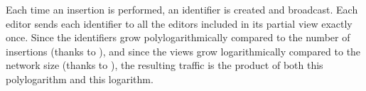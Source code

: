 \begin{asparadesc}
  Each time an insertion is performed, an identifier is created and broadcast.
  Each editor sends each identifier to all the editors included in its partial
  view exactly once. Since the identifiers grow polylogarithmically compared to
  the number of insertions (thanks to \LSEQ), and since the views grow
  logarithmically compared to the network size (thanks to \SPRAY), the resulting
  traffic is the product of both this polylogarithm and this logarithm.

\end{asparadesc}

